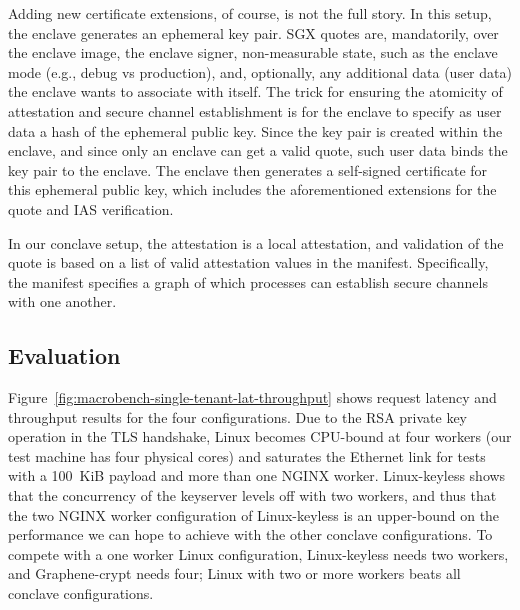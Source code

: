 Adding new certificate extensions, of course, is not the full story.
%
In this setup, the enclave generates an ephemeral key pair.
%
SGX quotes are, mandatorily, over the enclave image, the enclave signer,
non-measurable state, such as the enclave mode (e.g., debug vs production),
and, optionally, any additional data (user data) the enclave wants to
associate with itself.  
%
The trick for ensuring the atomicity of attestation and secure channel
establishment is for the enclave to specify as user data a hash of the ephemeral
public key.
%
Since the key pair is created within the enclave, and since only an enclave can
get a valid quote, such user data binds the key pair to the enclave.
%
The enclave then generates a self-signed certificate for this ephemeral public
key, which includes the aforementioned extensions for the quote and IAS
verification.


In our conclave setup, the attestation is a local attestation, and validation of
the quote is based on a list of valid attestation values in the manifest.
%
Specifically, the manifest specifies a graph of which processes can establish
secure channels with one another.


\subsection{Evaluation}

Figure~\ref{fig:macrobench-single-tenant-lat-throughput} shows
request latency and throughput results for the four configurations.
%
Due to the RSA private key operation in the TLS handshake, Linux becomes
CPU-bound at four workers (our test machine has four physical cores) and
saturates the Ethernet link for tests with a 100~KiB payload and more than one
NGINX worker.
%
Linux-keyless shows that the concurrency of the keyserver levels
off with two workers, and thus that the two NGINX worker configuration of
Linux-keyless is an upper-bound on the performance we can hope to achieve
with the other conclave configurations.
%
%
To compete with a one worker Linux configuration, Linux-keyless needs two
workers, and Graphene-crypt needs four; Linux with two or more workers beats
all conclave configurations.


